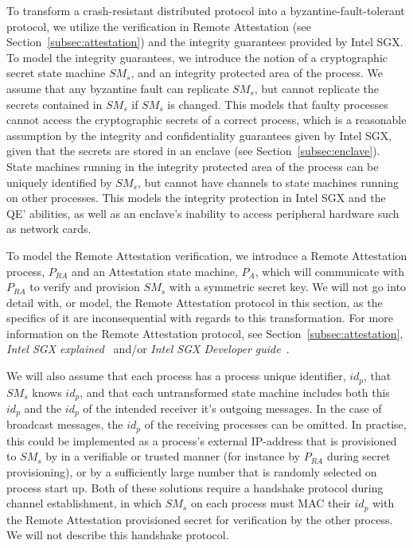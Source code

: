 \documentclass{article}
\begin{document}
	To transform a crash-resistant distributed protocol into a byzantine-fault-tolerant protocol, we utilize the verification in Remote Attestation (see Section~\ref{subsec:attestation}) and the integrity guarantees provided by Intel SGX.
	To model the integrity guarantees, we introduce the notion of a cryptographic secret state machine $SM_{s}$, and an integrity protected area of the process.
	We assume that any byzantine fault can replicate $SM_{s}$, but cannot replicate the secrets contained in $SM_s$ if $SM_s$ is changed.
	This models that faulty processes cannot access the cryptographic secrets of a correct process, which is a reasonable assumption by the integrity and confidentiality guarantees given by Intel SGX, given that the secrets are stored in an enclave (see Section~\ref{subsec:enclave}).
	State machines running in the integrity protected area of the process can be uniquely identified by $SM_{s}$, but cannot have channels to state machines running on other processes.
	This models the integrity protection in Intel SGX and the QE' abilities, as well as an enclave's inability to access peripheral hardware such as network cards.

	To model the Remote Attestation verification, we introduce a Remote Attestation process, $P_{RA}$ and an Attestation state machine, $P_A$, which will communicate with $P_{RA}$ to verify and provision $SM_s$ with a symmetric secret key.
	We will not go into detail with, or model, the Remote Attestation protocol in this section, as the specifics of it are inconsequential with regards to this transformation.
	For more information on the Remote Attestation protocol, see Section~\ref{subsec:attestation}, \textit{Intel SGX explained}~\cite{costan_intel_2016} and/or \textit{Intel SGX Developer guide}~\cite{intel_sgx_guide}.

	We will also assume that each process has a process unique identifier, $id_p$, that $SM_s$ knows $id_p$, and that each untransformed state machine includes both this $id_p$ and the $id_p$ of the intended receiver it's outgoing messages.
	In the case of broadcast messages, the $id_p$ of the receiving processes can be omitted.
	In practise, this could be implemented as a process's external IP-address that is provisioned to $SM_s$ by in a verifiable or trusted manner (for instance by $P_{RA}$ during secret provisioning), or by a sufficiently large number that is randomly selected on process start up.
	Both of these solutions require a handshake protocol during channel establishment, in which $SM_s$ on each process must MAC their $id_p$ with the Remote Attestation provisioned secret for verification by the other process.
	We will not describe this handshake protocol.
\end{document}
